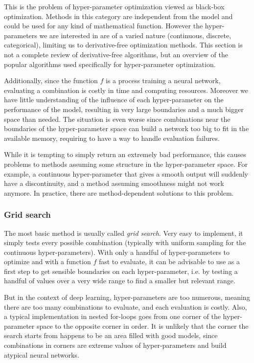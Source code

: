This is the problem of hyper-parameter optimization viewed as black-box optimization. Methods in this category are independent from the model and could be used for any kind of mathematical function. However the hyper-parameters we are interested in are of a varied nature (continuous, discrete, categorical), limiting us to derivative-free optimization methods. This section is not a complete review of derivative-free algorithms, but an overview of the popular algorithms used specifically for hyper-parameter optimization.

Additionally, since the function $f$ is a process training a neural network, evaluating a combination is costly in time and computing resources. Moreover we have little understanding of the influence of each hyper-parameter on the performance of the model, resulting in very large boundaries and a much bigger space than needed. The situation is even worse since combinations near the boundaries of the hyper-parameter space can build a network too big to fit in the available memory, requiring to have a way to handle evaluation failures. 

While it is tempting to simply return an extremely bad performance, this causes problems to methods assuming some structure in the hyper-parameter space. For example, a continuous hyper-parameter that gives a smooth output will suddenly have a discontinuity, and a method assuming smoothness might not work anymore. In practice, there are method-dependent solutions to this problem.

\subsubsection{Grid search}

The most basic method is usually called \textit{grid search}. Very easy to implement, it simply tests every possible combination (typically with uniform sampling for the continuous hyper-parameters). With only a handful of hyper-parameters to optimize and with a function $f$ fast to evaluate, it can be advisable to use as a first step to get sensible boundaries on each hyper-parameter, i.e. by testing a handful of values over a very wide range to find a smaller but relevant range.

But in the context of deep learning, hyper-parameters are too numerous, meaning there are too many combinations to evaluate, and each evaluation is costly. Also, a typical implementation in nested for-loops goes from one corner of the hyper-parameter space to the opposite corner in order. It is unlikely that the corner the search starts from happens to be an area filled with good models, since combinations in corners are extreme values of hyper-parameters and build atypical neural networks. 

